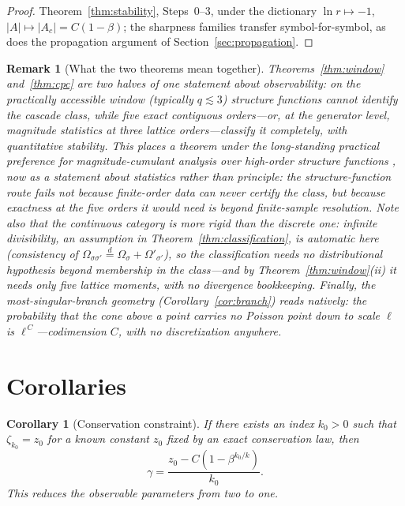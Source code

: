 \documentclass[pdflatex,sn-mathphys-num]{sn-jnl}
\theoremstyle{thmstyleone}
\newtheorem{corollary}[theorem]{Corollary}
\theoremstyle{thmstyletwo}
\newtheorem*{remark}{Remark}
\theoremstyle{thmstylethree}
\begin{document}
\begin{proof}
Theorem~\ref{thm:stability}, Steps~0--3, under the dictionary
$\ln r \mapsto -1$, $|A| \mapsto |A_c| = C(1-\beta)$; the sharpness
families transfer symbol-for-symbol, as does the propagation
argument of Section~\ref{sec:propagation}.
\end{proof}

\begin{remark}[What the two theorems mean together]
Theorems~\ref{thm:window} and~\ref{thm:cpc} are two halves of one
statement about observability: on the practically accessible
window (typically $q \lesssim 3$) structure functions cannot
identify the
cascade class, while five exact contiguous orders---or, at the
generator level, magnitude statistics at three lattice
orders---classify it completely, with quantitative stability.  This
places a theorem under the long-standing practical preference for
magnitude-cumulant analysis over high-order structure functions
\cite{DMA01}, now as a statement about statistics rather than
principle: the structure-function route fails not because
finite-order data can never certify the class, but because
exactness at the five orders it would need is beyond finite-sample
resolution.  Note also that the continuous
category is \emph{more} rigid than the discrete one: infinite
divisibility, an assumption in Theorem~\ref{thm:classification}, is
automatic here (consistency of $\Omega_{\sigma\sigma'}
\stackrel{d}{=} \Omega_\sigma + \Omega'_{\sigma'}$), so the
classification needs no distributional hypothesis beyond membership
in the class---and by Theorem~\ref{thm:window}(ii) it needs only
five lattice moments, with no divergence bookkeeping.  Finally, the
most-singular-branch geometry (Corollary~\ref{cor:branch}) reads
natively: the probability that the cone above a point carries no
Poisson point down to scale $\ell$ is $\ell^{\,C}$---codimension
$C$, with no discretization anywhere.
\end{remark}


\section{Corollaries}
\label{sec:corollaries}

\begin{corollary}[Conservation constraint]\label{cor:conservation}
If there exists an index $k_0 > 0$ such that $\zeta_{k_0} = z_0$ for
a known constant $z_0$ fixed by an exact conservation law, then
\[
  \gamma = \frac{z_0 - C(1-\beta^{k_0/k})}{k_0}.
\]
This reduces the observable parameters from two to one.
\end{corollary}
\end{document}
